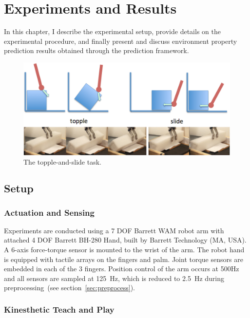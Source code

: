 \chapter{Experiments and Results}
\label{chap5}

In this chapter, I describe the experimental setup, provide details on the experimental procedure, and finally present and discuss environment property prediction results obtained through the prediction framework.

\begin{figure}[]
	\centering
	\includegraphics[width=\linewidth]{images/topple}
	\caption{The topple-and-slide task.}
	\label{fig:topple}
\end{figure}

\section{Setup}

\subsection{Actuation and Sensing}
\label{sec:actuation_and_sensing}

Experiments are conducted using a 7 DOF Barrett WAM robot arm with attached 4 DOF Barrett BH-280 Hand, built by Barrett Technology (MA, USA).
A 6-axis force-torque sensor is mounted to the wrist of the arm.
The robot hand is equipped with tactile arrays on the fingers and palm.
Joint torque sensors are embedded in each of the 3 fingers.
Position control of the arm occurs at 500Hz and all sensors are sampled at 125~Hz, which is reduced to 2.5~Hz during preprocessing~(see section~\ref{sec:preprocess}).

\subsection{Kinesthetic Teach and Play}
\label{sec:kinesthetic_teach_and_play}

